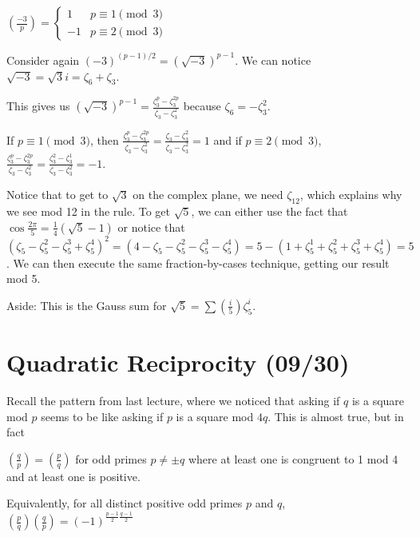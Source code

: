 \documentclass[notes]{agony}
\begin{document}
\begin{lemma}
  $(\frac{-3}{p}) = \begin{cases}1 & p \equiv 1 \pmod 3 \\ -1 & p \equiv 2 \pmod 3\end{cases}$
\end{lemma}
\begin{prf}
  Consider again $(-3)^{(p-1)/2} = (\sqrt{-3})^{p-1}$.
  We can notice $\sqrt{-3} = \sqrt{3} i = \zeta_6 + \zeta_3$.

  This gives us $(\sqrt{-3})^{p-1} = \frac{\zeta_3^p - \zeta_3^{2p}}{\zeta_3 - \zeta_3^2}$
  because $\zeta_6 = -\zeta_3^2$.

  If $p \equiv 1 \pmod 3$, then $\frac{\zeta_3^p - \zeta_3^{2p}}{\zeta_3 - \zeta_3^2}
    = \frac{\zeta_3 - \zeta_3^{2}}{\zeta_3 - \zeta_3^2} = 1$
  and if $p \equiv 2 \pmod 3$, $\frac{\zeta_3^p - \zeta_3^{2p}}{\zeta_3 - \zeta_3^2}
    = \frac{\zeta_3^2 - \zeta_3^1}{\zeta_3 - \zeta_3^2} = -1$.
\end{prf}

Notice that to get to $\sqrt{3}$ on the complex plane, we need $\zeta_{12}$,
which explains why we see mod 12 in the rule.
To get $\sqrt{5}$, we can either use the fact that $\cos \frac{2\pi}{5} = \frac14(\sqrt{5}-1)$
or notice that $(\zeta_5 - \zeta_5^2 - \zeta_5^3 + \zeta_5^4)^2
  = (4 - \zeta_5 - \zeta_5^2 - \zeta_5^3 - \zeta_5^4)
  = 5 - (1 + \zeta_5^1 + \zeta_5^2 + \zeta_5^3 + \zeta_5^4) = 5$.
We can then execute the same fraction-by-cases technique, getting our result mod 5.

Aside: This is the Gauss sum for $\sqrt{5} = \sum (\frac{i}{5})\zeta_5^i$.

\section{Quadratic Reciprocity (09/30)}

Recall the pattern from last lecture,
where we noticed that asking if $q$ is a square mod $p$
seems to be like asking if $p$ is a square mod $4q$.
This is almost true, but in fact

\begin{theorem}
  $(\frac{q}{p}) = (\frac{p}{q})$ for odd primes $p \neq \pm q$
  where at least one is congruent to 1 mod 4 and at least one is positive.
\end{theorem}

Equivalently, for all distinct positive odd primes $p$ and $q$,
$(\frac{p}{q})(\frac{q}{p}) = (-1)^{\frac{p-1}{2}\frac{q-1}{2}}$
\end{document}
